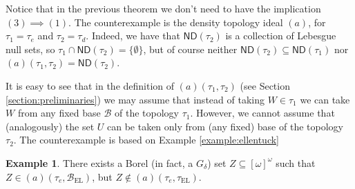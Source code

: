 \documentclass[12pt]{amsart}
\theoremstyle{plain}
\theoremstyle{definition}
\newtheorem{example}[theorem]{Example}
\theoremstyle{remark}
\newcommand{\infsub}{[\omega]^{\omega}}
\newcommand{\cB}{{\mathcal B}}
\newcommand{\aideal}{\mathit{(a)}}
\newcommand{\tauEllentuck}{\tau_{\mathrm{EL}}}
\newcommand{\baseEllentuck}{\cB_{\mathrm{EL}}}
\begin{document}
Notice that in the previous theorem we don't need to have
the implication $(3) \implies (1)$. The counterexample 
is the density topology ideal $\aideal$, for $\tau_1 = \tau_e$
and $\tau_2 = \tau_d$. Indeed, we have 
that $\mathsf{ND}(\tau_2)$ is a collection of Lebesgue null sets, 
so $\tau_1 \cap \mathsf{ND}(\tau_2) = \lbrace \emptyset \rbrace$,
but of course neither $\mathsf{ND}(\tau_2) \subseteq \mathsf{ND}(\tau_1)$ 
nor $\aideal(\tau_1, \tau_2) = \mathsf{ND}(\tau_2)$.

It is easy to see that in the definition of $\aideal(\tau_1, \tau_2)$
(see Section \ref{section:preliminaries})
we may assume that instead of taking $W \in \tau_1$
we can take $W$ from any fixed base $\cB$ of the topology
$\tau_1$. However, we cannot assume that (analogously)
the set $U$ can be taken only from (any fixed) base of
the topology $\tau_2$. The counterexample is based 
on Example \ref{example:ellentuck}

\begin{example}
There exists a Borel (in fact,
a $G_{\delta}$) %
set $Z \subseteq \infsub$ such that 
$Z \in \aideal(\tau_e, \baseEllentuck)$, but
$Z \not\in \aideal(\tau_e, \tauEllentuck)$.
\end{example}
\end{document}
